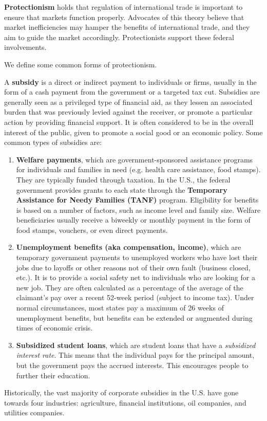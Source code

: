\documentclass{article}
\begin{document}
      \begin{definition}[Protectionism]
        \textbf{Protectionism} holds that regulation of international trade is important to ensure that markets function properly. Advocates of this theory believe that market inefficiencies may hamper the benefits of international trade, and they aim to guide the market accordingly. Protectionists support these federal involvements. 
      \end{definition}

      We define some common forms of protectionism. 

      \begin{definition}[Subsidies]
        A \textbf{subsidy} is a direct or indirect payment to individuals or firms, usually in the form of a cash payment from the government or a targeted tax cut. Subsidies are generally seen as a privileged type of financial aid, as they lessen an associated burden that was previously levied against the receiver, or promote a particular action by providing financial support. It is often considered to be in the overall interest of the public, given to promote a social good or an economic policy. Some common types of subsidies are: 
        \begin{enumerate}
          \item \textbf{Welfare payments}, which are government-sponsored assistance programs for individuals and families in need (e.g. health care assistance, food stamps). They are typically funded through taxation. In the U.S., the federal government provides grants to each state through the \textbf{Temporary Assistance for Needy Families (TANF)} program. Eligibility for benefits is based on a number of factors, such as income level and family size. Welfare beneficiaries usually receive a biweekly or monthly payment in the form of food stamps, vouchers, or even direct payments. 
          \item \textbf{Unemployment benefits (aka compensation, income)}, which are temporary government payments to unemployed workers who have lost their jobs due to layoffs or other reasons not of their own fault (business closed, etc.). It is to provide a social safety net to individuals who are looking for a new job. They are often calculated as a percentage of the average of the claimant's pay over a recent 52-week period (subject to income tax). Under normal circumstances, most states pay a maximum of 26 weeks of unemployment benefits, but benefits can be extended or augmented during times of economic crisis. 
          \item \textbf{Subsidized student loans}, which are student loans that have a \textit{subsidized interest rate}. This means that the individual pays for the principal amount, but the government pays the accrued interests. This encourages people to further their education. 
        \end{enumerate}
        Historically, the vast majority of corporate subsidies in the U.S. have gone towards four industries: agriculture, financial institutions, oil companies, and utilities companies. 
      \end{definition}
\end{document}
